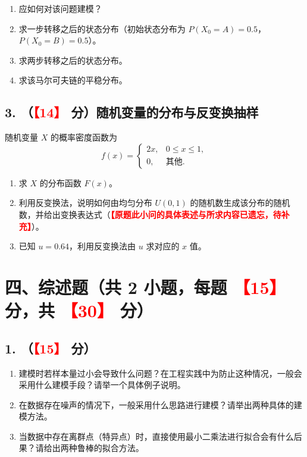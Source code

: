 \documentclass[12pt,a4paper,UTF8,fontset=fandol]{ctexart}
\newcommand{\ph}[1]{\textcolor{red}{\textbf{【#1】}}}
\begin{document}
\begin{enumerate}[label=（\arabic*）]
  \item 应如何对该问题建模？
  \item 求一步转移之后的状态分布（初始状态分布为 $P(X_0=A)=0.5$，$P(X_0=B)=0.5$）。
  \item 求两步转移之后的状态分布。
  \item 求该马尔可夫链的平稳分布。
\end{enumerate}

\subsection*{3. （\ph{14} 分）随机变量的分布与反变换抽样}

随机变量 $X$ 的概率密度函数为
\[
f(x) = \begin{cases}
2x, & 0 \le x \le 1,\\
0, & \text{其他}.
\end{cases}
\]

\begin{enumerate}[label=（\arabic*）]
  \item 求 $X$ 的分布函数 $F(x)$。
  \item 利用反变换法，说明如何由均匀分布 $U(0,1)$ 的随机数生成该分布的随机数，并给出变换表达式（\ph{原题此小问的具体表述与所求内容已遗忘，待补充}）。
  \item 已知 $u = 0.64$，利用反变换法由 $u$ 求对应的 $x$ 值。
\end{enumerate}

\section*{四、综述题（共 2 小题，每题 \ph{15} 分，共 \ph{30} 分）}

\subsection*{1. （\ph{15} 分）}

\begin{enumerate}[label=（\arabic*）]
  \item 建模时若样本量过小会导致什么问题？在工程实践中为防止这种情况，一般会采用什么建模手段？请举一个具体例子说明。
  \item 在数据存在噪声的情况下，一般采用什么思路进行建模？请举出两种具体的建模方法。
  \item 当数据中存在离群点（特异点）时，直接使用最小二乘法进行拟合会有什么后果？请给出两种鲁棒的拟合方法。
\end{enumerate}
\end{document}
